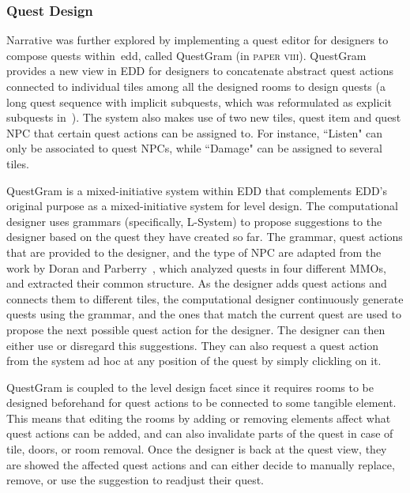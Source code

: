 
\subsubsection{Quest Design}

Narrative was further explored by implementing a quest editor for designers to compose quests within~\acrshort{edd}, called QuestGram (in \textsc{paper viii}). QuestGram provides a new view in EDD for designers to concatenate abstract quest actions connected to individual tiles among all the designed rooms to design quests (a long quest sequence with implicit subquests, which was reformulated as explicit subquests in~\cite{larsson_queststories_2021}). The system also makes use of two new tiles, quest item and quest NPC that certain quest actions can be assigned to. For instance, ``Listen" can only be associated to quest NPCs, while ``Damage" can be assigned to several tiles. 

QuestGram is a mixed-initiative system within EDD that complements EDD's original purpose as a mixed-initiative system for level design. The computational designer uses grammars (specifically, L-System) to propose suggestions to the designer based on the quest they have created so far. The grammar, quest actions that are provided to the designer, and the type of NPC are adapted from the work by Doran and Parberry~\cite{doran_prototype_2011}, which analyzed quests in four different MMOs, and extracted their common structure. As the designer adds quest actions and connects them to different tiles, the computational designer continuously generate quests using the grammar, and the ones that match the current quest are used to propose the next possible quest action for the designer. The designer can then either use or disregard this suggestions. They can also request a quest action from the system ad hoc at any position of the quest by simply clickling on it.

QuestGram is coupled to the level design facet since it requires rooms to be designed beforehand for quest actions to be connected to some tangible element. This means that editing the rooms by adding or removing elements affect what quest actions can be added, and can also invalidate parts of the quest in case of tile, doors, or room removal. Once the designer is back at the quest view, they are showed the affected quest actions and can either decide to manually replace, remove, or use the suggestion to readjust their quest. 

